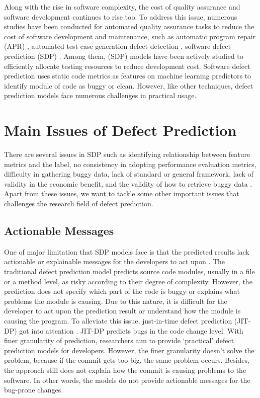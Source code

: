 Along with the rise in software complexity, the cost of quality assurance and software development continues to rise too.
To address this issue, numerous studies have been conducted for automated quality assurance tasks to reduce the cost of software development and maintenance, such as automatic program repair (APR) \cite{kim2013automatic, long2016automatic, mechtaev2016angelix}, automated test case generation \cite{ali2009systematic, anand2013orchestrated, lei2008ipog} defect detection \cite{pradel2012leveraging, pradel2018deepbugs, wang2016bugram}, software defect prediction (SDP) \cite{nam2017heterogeneous, wang2016automatically, zimmermann2009cross}.
Among them, (SDP) models have been actively studied to efficiently allocate testing resources to reduce development cost.
Software defect prediction uses static code metrics as features on machine learning predictors to identify module of code as buggy or clean. 
However, like other techniques, defect prediction models face numerous challenges in practical usage.

\section{Main Issues of Defect Prediction}
There are several issues in SDP such as identifying relationship between feature metrics and the label, no consistency in adopting performance evaluation metrics, difficulty in gathering buggy data, lack of standard or general framework, lack of validity in the economic benefit, and the validity of how to retrieve buggy data \cite{arora2015open, herbold2019issues}.
Apart from these issues, we want to tackle some other important issues that challenges the research field of defect prediction.

\subsection{Actionable Messages}
One of major limitation that SDP models face is that the predicted results lack actionable or explainable messages for the developers to act upon \cite{lewis2013does}.
The traditional defect prediction model predicts source code modules, usually in a file or a method level, as risky according to their degree of complexity.
However, the prediction does not specify which part of the code is buggy or explains what problems the module is causing.
Due to this nature, it is difficult for the developer to act upon the prediction result or understand how the module is causing the program.
To alleviate this issue, just-in-time defect prediction  (JIT-DP) got into attention \cite{kamei2012large}.
JIT-DP predicts bugs in the code change level.
With finer granularity of prediction, researchers aim to provide `practical' defect prediction models for developers.
However, the finer granularity doesn't solve the problem, because if the commit gets too big, the same problem occurs.
Besides, the approach still does not explain how the commit is causing problems to the software.
In other words, the models do not provide actionable messages for the bug-prone changes.

